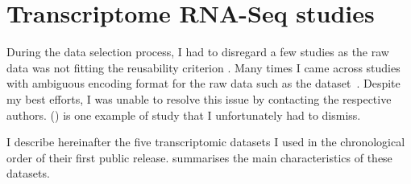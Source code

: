 \section{Transcriptome RNA-Seq studies}\label{sec:rnaseq-data}

During the data selection process,
I had to disregard a few studies as the raw data was not fitting
the reusability criterion .
Many times I came across studies with ambiguous encoding
format for the raw data such
as the  dataset~.
Despite my best efforts,
I was unable to resolve this issue
by contacting the respective authors.
\citet{Burge} () is one example of study
that I unfortunately had to dismiss.\mybr\

I describe hereinafter the five transcriptomic datasets I used
in the chronological order of their first public release.
 summarises the main characteristics of these datasets.\mybr\

